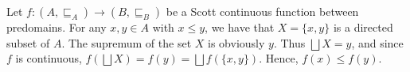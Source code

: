 Let $ f:(A, \sqsubseteq_A) \to (B, \sqsubseteq_B) $ be a Scott continuous function between predomains. For any $x,y \in A$ with $ x \leq y $, we have that
    $ X = \{x,y\} $ is a directed subset of $A$. The supremum of the set $X$ is obviously $y$. Thus $\bigsqcup X = y$, and since $f$ is continuous, $f(\bigsqcup X) = f(y) = \bigsqcup f(\{x,y\})$.
    Hence, $f(x) \leq f(y)$.
